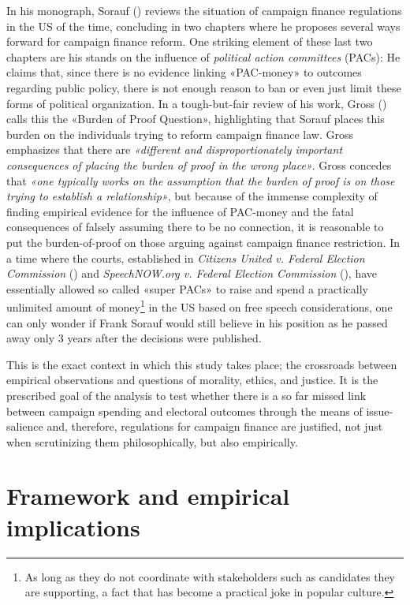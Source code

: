 \documentclass[11pt,a4paper]{article}
\begin{document}
In his monograph, Sorauf (\citeyear{sorauf_inside_1992}) reviews the situation of campaign finance regulations in the US of the time, concluding in two chapters where he proposes several ways forward for campaign finance reform. One striking element of these last two chapters are his stands on the influence of \textit{political action committees} (PACs): He claims that, since there is no evidence linking «PAC-money» to outcomes regarding public policy, there is not enough reason to ban or even just limit these forms of political organization. In a tough-but-fair review of his work, Gross (\citeyear{gross_inside_1993}) calls this the «Burden of Proof Question», highlighting that Sorauf places this burden on the individuals trying to reform campaign finance law. Gross emphasizes that there are \textit{«different and disproportionately important consequences of placing the burden of proof in the wrong place»}. Gross concedes that \textit{«one typically works on the assumption that the burden of proof is on those trying to establish a relationship»}, but because of the immense complexity of finding empirical evidence for the influence of PAC-money and the fatal consequences of falsely assuming there to be no connection, it is reasonable to put the burden-of-proof on those arguing against campaign finance restriction. In a time where the courts, established in \textit{Citizens United v. Federal Election Commission} (\citeyear{kennedy_citizens_2010}) and \textit{SpeechNOW.org v. Federal Election Commission} (\citeyear{sentelle_speechnoworg_2010}), have essentially allowed so called «super PACs» to raise and spend a practically unlimited amount of money\footnote{ As long as they do not coordinate with stakeholders such as candidates they are supporting, a fact that has become a practical joke in popular culture.} in the US based on free speech considerations, one can only wonder if Frank Sorauf would still believe in his position as he passed away only 3 years after the decisions were published.

This is the exact context in which this study takes place; the crossroads between empirical observations and questions of morality, ethics, and justice. It is the prescribed goal of the analysis to test whether there is a so far missed link between campaign spending and electoral outcomes through the means of issue-salience and, therefore, regulations for campaign finance are justified, not just when scrutinizing them philosophically, but also empirically.


\section{Framework and empirical implications}
\end{document}

